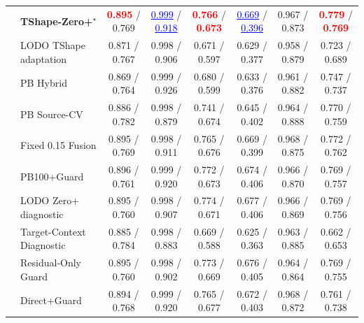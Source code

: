 \begin{table}[t]
{\begin{tabular}{@{}llcccccc@{}}
 & \textbf{TShape-Zero+$^{\star}$} & \textcolor{red}{\textbf{0.895}} / 0.769 & \textcolor{blue}{\underline{0.999}} / \textcolor{blue}{\underline{0.918}} & \textcolor{red}{\textbf{0.766}} / \textcolor{red}{\textbf{0.673}} & \textcolor{blue}{\underline{0.669}} / \textcolor{blue}{\underline{0.396}} & 0.967 / 0.873 & \textcolor{red}{\textbf{0.779}} / \textcolor{red}{\textbf{0.769}} \\
 & LODO TShape adaptation & 0.871 / 0.767 & 0.998 / 0.906 & 0.671 / 0.597 & 0.629 / 0.377 & 0.958 / 0.879 & 0.723 / 0.689 \\
 & PB Hybrid & 0.869 / 0.764 & 0.999 / 0.926 & 0.680 / 0.599 & 0.633 / 0.376 & 0.961 / 0.882 & 0.747 / 0.737 \\
 & PB Source-CV & 0.886 / 0.782 & 0.998 / 0.879 & 0.741 / 0.674 & 0.645 / 0.402 & 0.964 / 0.888 & 0.770 / 0.759 \\
 & Fixed 0.15 Fusion & 0.895 / 0.769 & 0.998 / 0.911 & 0.765 / 0.676 & 0.669 / 0.399 & 0.968 / 0.875 & 0.772 / 0.762 \\
 & PB100+Guard & 0.896 / 0.761 & 0.999 / 0.920 & 0.772 / 0.673 & 0.674 / 0.406 & 0.966 / 0.870 & 0.769 / 0.757 \\
 & LODO Zero+ diagnostic & 0.895 / 0.760 & 0.998 / 0.907 & 0.774 / 0.671 & 0.677 / 0.406 & 0.966 / 0.869 & 0.769 / 0.756 \\
 & Target-Context Diagnostic & 0.885 / 0.784 & 0.998 / 0.883 & 0.669 / 0.588 & 0.625 / 0.363 & 0.963 / 0.885 & 0.662 / 0.653 \\
 & Residual-Only Guard & 0.895 / 0.760 & 0.998 / 0.902 & 0.773 / 0.669 & 0.676 / 0.405 & 0.964 / 0.864 & 0.769 / 0.755 \\
 & Direct+Guard & 0.894 / 0.768 & 0.999 / 0.920 & 0.765 / 0.677 & 0.672 / 0.403 & 0.968 / 0.872 & 0.761 / 0.738 \\
\bottomrule
\end{tabular}}
\renewcommand{\arraystretch}{1.0}
\end{table}
